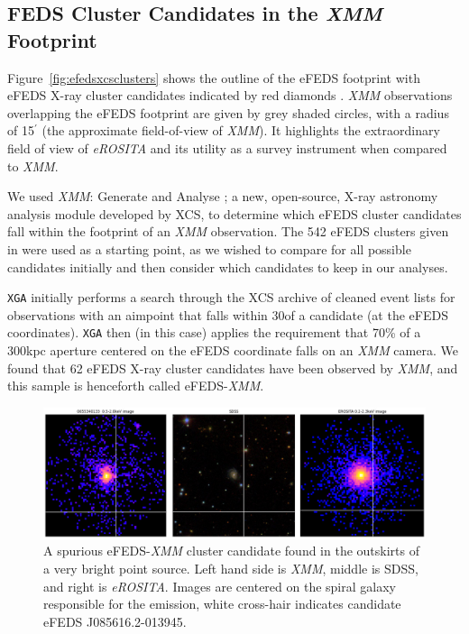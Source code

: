 \documentclass[fleqn,usenatbib]{mnras}
\begin{document}
\subsection{FEDS Cluster Candidates in the {\em XMM} Footprint}

Figure~\ref{fig:efedsxcsclusters} shows the outline of the eFEDS footprint with eFEDS X-ray cluster candidates indicated by red diamonds \cite[as taken from the catalogue of][]{efedsclustercat}. {\em XMM} observations overlapping the eFEDS footprint are given by grey shaded circles, with a radius of 15$^{\prime}$ (the approximate field-of-view of {\em XMM}). It highlights the extraordinary field of view of {\em eROSITA} and its utility as a survey instrument when compared to {\em XMM}. 

We used {\em XMM}: Generate and Analyse \citep[\texttt{XGA}\footnote{\href{https://github.com/DavidT3/XGA}{{\em XMM}: Generate and Analyse GitHub}}][]{xgapaper}; a new, open-source, X-ray astronomy analysis module developed by XCS, to determine which eFEDS cluster candidates fall within the footprint of an {\em XMM} observation. The 542 eFEDS clusters given in \cite{efedsclustercat} were used as a starting point, as we wished to compare for all possible candidates initially and then consider which candidates to keep in our analyses.

\texttt{XGA} initially performs a search through the XCS archive of cleaned event lists for observations with an aimpoint that falls within 30\arcmin of a candidate (at the eFEDS coordinates). \texttt{XGA} then (in this case) applies the requirement that 70\% of a 300kpc aperture centered on the eFEDS coordinate falls on an {\em XMM} camera. We found that 62 eFEDS X-ray cluster candidates have been observed by {\em XMM}, and this sample is henceforth called eFEDS-{\em XMM}.

\begin{figure}
    \centering
    \includegraphics[width=1\textwidth]{images/outskirt_cands.png}
    \caption[]{A spurious eFEDS-{\em XMM} cluster candidate found in the outskirts of a very bright point source. Left hand side is {\em XMM}, middle is SDSS, and right is {\em eROSITA}. Images are centered on the spiral galaxy responsible for the emission, white cross-hair indicates candidate eFEDS J085616.2-013945.}
    \label{fig:brightoutskirts}
\end{figure}
\end{document}
